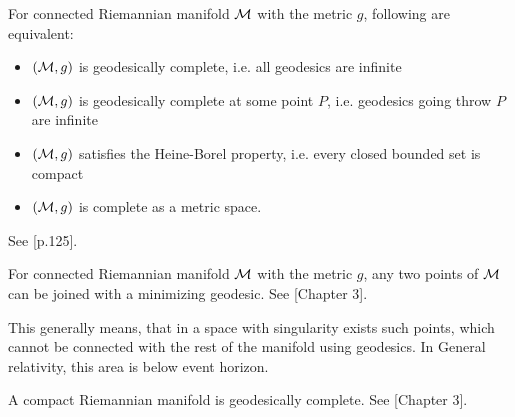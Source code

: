 \begin{thm}
    \label{thm:hopf-Rinow}
    For connected Riemannian manifold $\mathcal{M}$ with the metric $g$, following are equivalent:
\begin{itemize}
    \item $(\mathcal{M},g)$ is geodesically complete, i.e. all geodesics are infinite
    \item $(\mathcal{M},g)$ is geodesically complete at some point $P$, i.e. geodesics going throw $P$ are infinite
    \item $(\mathcal{M},g)$ satisfies the Heine-Borel property, i.e. every closed bounded set is compact
    \item $(\mathcal{M},g)$ is complete as a metric space.
\end{itemize}
See \citet{petersen}[p.125].
\end{thm}
\begin{thm}
    \label{thm:hopf-Rinow_modified}
    For connected Riemannian manifold $\mathcal{M}$ with the metric $g$, any two points of $\mathcal{M}$ can be joined with a minimizing geodesic. See \citet{claudio}[Chapter 3].
\end{thm}
This generally means, that in a space with singularity exists such points, which cannot be connected with the rest of the manifold using geodesics. In General relativity, this area is below event horizon.

\begin{thm}
    \label{thm:compact}
    A compact Riemannian manifold is geodesically complete. See \citet{claudio}[Chapter 3].
\end{thm}





